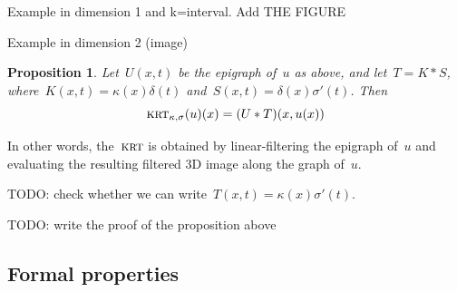 \documentclass[12pt]{article}                  %
\newtheorem{proposition}{Proposition}
\begin{document}
Example in dimension 1 and k=interval.  Add THE FIGURE

Example in dimension 2 (image)

\begin{proposition}
Let~$U(x,t)$ be the epigraph of~$u$ as above, and let~$T=K*S$,
where~$K(x,t)=\kappa(x)\delta(t)$ and~$S(x,t)=\delta(x)\sigma'(t)$.  Then
\[
	\textsc{krt}_{\kappa,\sigma}(u)(x) = (U*T)(x,u(x))
\]
\end{proposition}
In other words, the~$\textsc{krt}$ is obtained by
linear-filtering the epigraph of~$u$ and evaluating the resulting filtered
3D image along the graph of~$u$.

TODO: check whether we can write~$T(x,t)=\kappa(x)\sigma'(t)$.

TODO: write the proof of the proposition above

\subsection{Formal properties}

\end{document}
